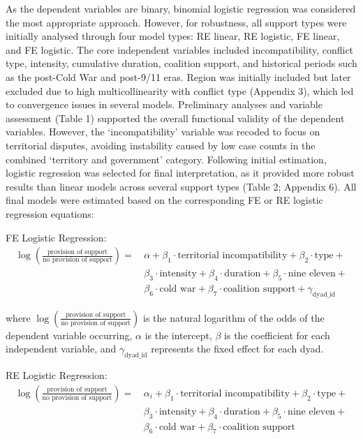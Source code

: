 \documentclass[
]{article}
\begin{document}
As the dependent variables are binary, binomial logistic regression was
considered the most appropriate approach. However, for robustness, all
support types were initially analysed through four model types: RE
linear, RE logistic, FE linear, and FE logistic. The core independent
variables included incompatibility, conflict type, intensity, cumulative
duration, coalition support, and historical periods such as the
post-Cold War and post-9/11 eras. Region was initially included but
later excluded due to high multicollinearity with conflict type
(Appendix 3), which led to convergence issues in several models.
Preliminary analyses and variable assessment (Table 1) supported the
overall functional validity of the dependent variables. However, the
`incompatibility' variable was recoded to focus on territorial disputes,
avoiding instability caused by low case counts in the combined
`territory and government' category. Following initial estimation,
logistic regression was selected for final interpretation, as it
provided more robust results than linear models across several support
types (Table 2; Appendix 6). All final models were estimated based on
the corresponding FE or RE logistic regression equations:

FE Logistic Regression: \[
\begin{aligned}
\log \left( \frac{\text{provision of support}}{\text{no provision of support}} \right) =\,
&\alpha + 
\beta_1 \cdot \text{territorial incompatibility} + 
\beta_2 \cdot \text{type} + \\
&\beta_3 \cdot \text{intensity} + 
 \beta_4 \cdot \text{duration} + 
\beta_5 \cdot \text{nine eleven} + \\
&\beta_6 \cdot \text{cold war} + 
\beta_7 \cdot \text{coalition support} + 
\gamma_{\text{dyad\_id}}
\end{aligned}
\]

where
\(\log \left( \frac{\text{provision of support}}{\text{no provision of support}} \right)\)
is the natural logarithm of the odds of the dependent variable
occurring, \(\alpha\) is the intercept, \(\beta\) is the coefficient for
each independent variable, and \(\gamma_{\text{dyad\_id}}\) represents
the fixed effect for each dyad.

RE Logistic Regression: \[
\begin{aligned}
\log \left( \frac{\text{provision of support}}{\text{no provision of support}} \right) =\,
&\alpha_i + 
\beta_1 \cdot \text{territorial incompatibility} + 
\beta_2 \cdot \text{type} + \\
&\beta_3 \cdot \text{intensity} + 
\beta_4 \cdot \text{duration} + 
\beta_5 \cdot \text{nine eleven} + \\
&\beta_6 \cdot \text{cold war} + 
\beta_7 \cdot \text{coalition support}
\end{aligned}
\]
\end{document}
